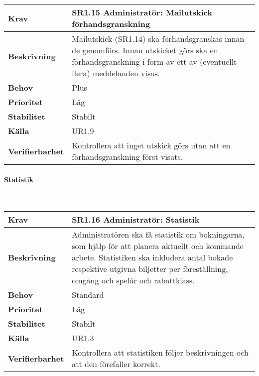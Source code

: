 \documentclass[a4paper, twoside, 11pt, titlepage]{article}
\begin{document}
			\begin {table} [ht] \begin{tabular} { p{2.6cm} p{12.5cm} }
				\hline
				\sffamily\textbf{Krav} & \sffamily\textbf{SR1.15 Administratör: Mailutskick förhandsgranskning } \\
				\hline
				\sffamily\textbf{Beskrivning} & Mailutskick (SR1.14) ska förhandsgranskas innan de genomförs. Innan utskicket görs ska en förhandsgranskning i form av ett av (eventuellt flera) meddelanden visas.  \\
				\hline
				\sffamily\textbf{Behov} & Plus  \\
				\hline
				\sffamily\textbf{Prioritet} & Låg  \\
				\hline
				\sffamily\textbf{Stabilitet} & Stabilt  \\
				\hline
				\sffamily\textbf{Källa} & UR1.9  \\
				\hline
				\sffamily\textbf{Verifierbarhet} & Kontrollera att inget utskick görs utan att en förhandsgranskning först visats.  \\
				\hline
			\end{tabular} \end{table} \FloatBarrier


			\paragraph{Statistik}\

			\begin {table} [ht] \begin{tabular} { p{2.6cm} p{12.5cm} }
				\hline
				\sffamily\textbf{Krav} & \sffamily\textbf{SR1.16 Administratör: Statistik } \\
				\hline
				\sffamily\textbf{Beskrivning} & Administratören ska få statistik om bokningarna, som hjälp för att planera aktuellt och kommande arbete. Statistiken ska inkludera antal bokade respektive utgivna biljetter per föreställning, omgång och spelår och rabattklass.  \\
				\hline
				\sffamily\textbf{Behov} & Standard  \\
				\hline
				\sffamily\textbf{Prioritet} & Låg  \\
				\hline
				\sffamily\textbf{Stabilitet} & Stabilt  \\
				\hline
				\sffamily\textbf{Källa} & UR1.3  \\
				\hline
				\sffamily\textbf{Verifierbarhet} & Kontrollera att statistiken följer beskrivningen och att den förefaller korrekt.  \\
				\hline
			\end{tabular} \end{table} \FloatBarrier
			\vspace{6mm}
\end{document}
